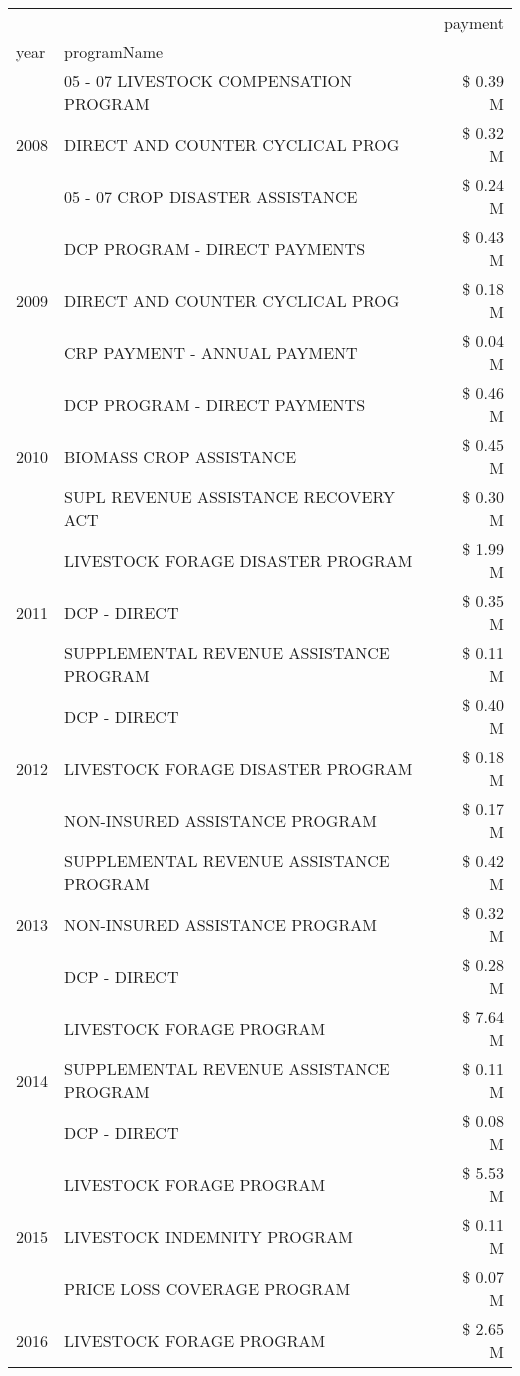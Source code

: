 \begin{tabular}{llr}
\toprule
 &  & payment \\
year & programName &  \\
\midrule
\multirow[t]{3}{*}{2008} & 05 - 07 LIVESTOCK COMPENSATION PROGRAM & \$ 0.39 M \\
 & DIRECT AND COUNTER CYCLICAL PROG & \$ 0.32 M \\
 & 05 - 07 CROP DISASTER ASSISTANCE & \$ 0.24 M \\
\cline{1-3}
\multirow[t]{3}{*}{2009} & DCP PROGRAM - DIRECT PAYMENTS & \$ 0.43 M \\
 & DIRECT AND COUNTER CYCLICAL PROG & \$ 0.18 M \\
 & CRP PAYMENT - ANNUAL PAYMENT & \$ 0.04 M \\
\cline{1-3}
\multirow[t]{3}{*}{2010} & DCP PROGRAM - DIRECT PAYMENTS & \$ 0.46 M \\
 & BIOMASS CROP ASSISTANCE & \$ 0.45 M \\
 & SUPL REVENUE ASSISTANCE RECOVERY ACT & \$ 0.30 M \\
\cline{1-3}
\multirow[t]{3}{*}{2011} & LIVESTOCK FORAGE DISASTER PROGRAM & \$ 1.99 M \\
 & DCP - DIRECT & \$ 0.35 M \\
 & SUPPLEMENTAL REVENUE ASSISTANCE PROGRAM & \$ 0.11 M \\
\cline{1-3}
\multirow[t]{3}{*}{2012} & DCP - DIRECT & \$ 0.40 M \\
 & LIVESTOCK FORAGE DISASTER PROGRAM & \$ 0.18 M \\
 & NON-INSURED ASSISTANCE PROGRAM & \$ 0.17 M \\
\cline{1-3}
\multirow[t]{3}{*}{2013} & SUPPLEMENTAL REVENUE ASSISTANCE PROGRAM & \$ 0.42 M \\
 & NON-INSURED ASSISTANCE PROGRAM & \$ 0.32 M \\
 & DCP - DIRECT & \$ 0.28 M \\
\cline{1-3}
\multirow[t]{3}{*}{2014} & LIVESTOCK FORAGE PROGRAM & \$ 7.64 M \\
 & SUPPLEMENTAL REVENUE ASSISTANCE PROGRAM & \$ 0.11 M \\
 & DCP - DIRECT & \$ 0.08 M \\
\cline{1-3}
\multirow[t]{3}{*}{2015} & LIVESTOCK FORAGE PROGRAM & \$ 5.53 M \\
 & LIVESTOCK INDEMNITY PROGRAM & \$ 0.11 M \\
 & PRICE LOSS COVERAGE PROGRAM & \$ 0.07 M \\
\cline{1-3}
\multirow[t]{3}{*}{2016} & LIVESTOCK FORAGE PROGRAM & \$ 2.65 M \\

\end{tabular}
